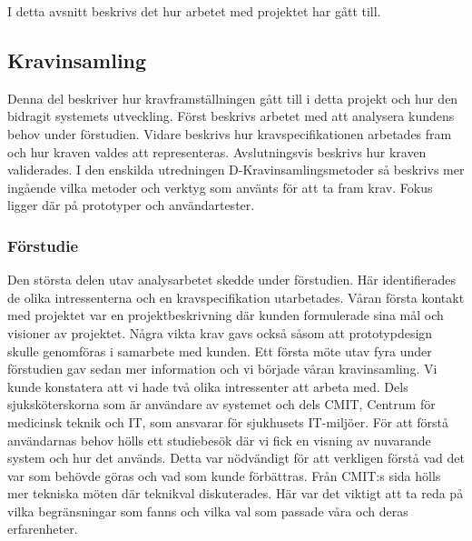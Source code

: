 \documentclass{article}
\begin{document}
I detta avsnitt beskrivs det hur arbetet med projektet har gått till.
\subsection{Kravinsamling}


Denna del beskriver hur kravframställningen gått till i detta projekt och hur den bidragit systemets utveckling. Först beskrivs arbetet med att analysera kundens behov under förstudien. Vidare beskrivs hur kravspecifikationen arbetades fram och hur kraven valdes att representeras. Avslutningsvis beskrivs hur kraven validerades. I den enskilda utredningen D-Kravinsamlingsmetoder så beskrivs mer ingående vilka metoder och verktyg som använts för att ta fram krav. Fokus ligger där på prototyper och användartester.
\subsubsection{Förstudie}
Den största delen utav analysarbetet skedde under förstudien. Här identifierades de olika intressenterna och en kravspecifikation utarbetades. Våran första kontakt med projektet var en projektbeskrivning där kunden formulerade sina mål och visioner av projektet. Några vikta krav gavs också såsom att prototypdesign skulle genomföras i samarbete med kunden. Ett första möte utav fyra under förstudien gav sedan mer information och vi började våran kravinsamling. Vi kunde konstatera att vi hade två olika intressenter att arbeta med. Dels sjuksköterskorna som är användare av systemet och dels CMIT, Centrum för medicinsk teknik och IT, som ansvarar för sjukhusets IT-miljöer. För att förstå användarnas behov hölls ett studiebesök där vi fick en visning av nuvarande system och hur det används. Detta var nödvändigt för att verkligen förstå vad det var som behövde göras och vad som kunde förbättras. Från CMIT:s sida hölls mer tekniska möten där teknikval diskuterades. Här var det viktigt att ta reda på vilka begränsningar som fanns och vilka val som passade våra och deras erfarenheter.
\end{document}
